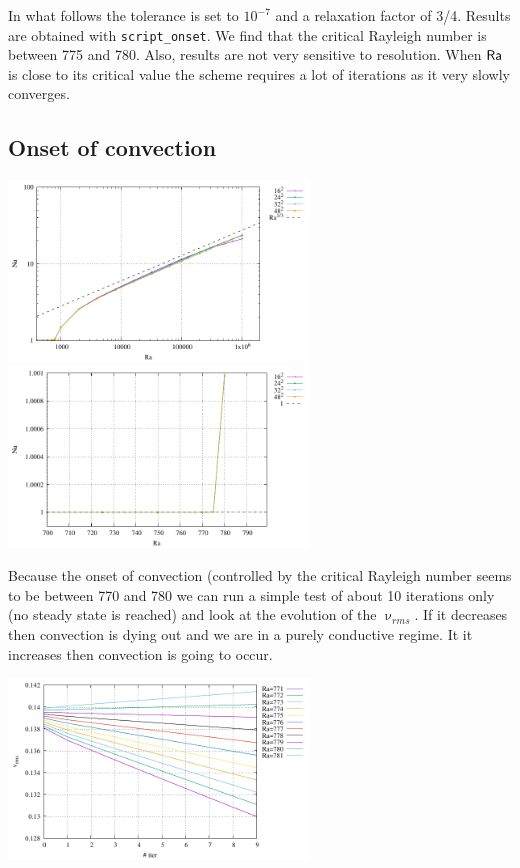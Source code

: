 
\newpage

In what follows the tolerance is set to $10^{-7}$ and a relaxation factor of 3/4. 
Results are obtained with {\tt script\_onset}.
We find that the critical Rayleigh number is between 775 and 780.
Also, results are not very sensitive to resolution.
When ${\mathsf{Ra}}$ is close to its critical value the scheme requires a lot of iterations
as it very slowly converges.

\subsection*{Onset of convection}

\begin{center}
\includegraphics[width=8cm]{python_codes/md/results_new/onset}
\includegraphics[width=8cm]{python_codes/md/results_new/onset_zoom}
\end{center}

Because the onset of convection (controlled by the critical Rayleigh 
number seems to be between 770 and 780 we can run a simple test 
of about 10 iterations only (no steady state is reached) and look at 
the evolution of the $\upnu_{rms}$. If it decreases then convection is dying out
and we are in a purely conductive regime. 
It it increases then convection is going to occur.
\begin{center}
\includegraphics[width=8cm]{python_codes/md/results_onset2/vrms}
\end{center}

